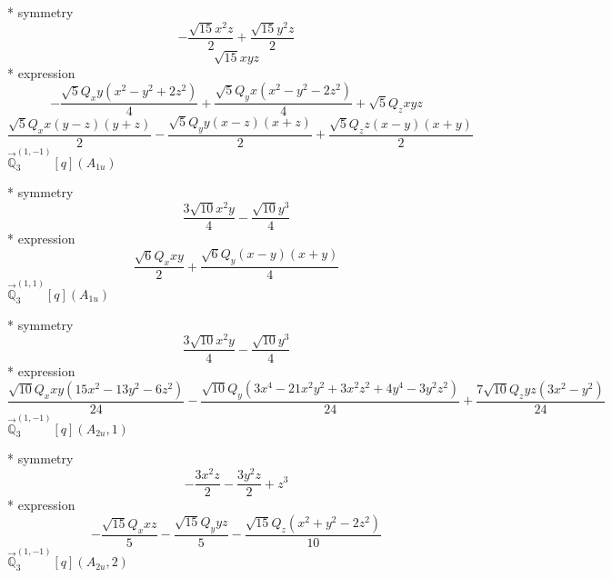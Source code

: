 \documentclass[fleqn,8pt]{jsarticle}
\begin{document}
\noindent\quad ** symmetry
\begin{dmath*}
- \frac{\sqrt{15} x^{2} z}{2} + \frac{\sqrt{15} y^{2} z}{2}
\end{dmath*}
\begin{dmath*}
\sqrt{15} x y z
\end{dmath*}
\noindent\quad ** expression
\begin{dmath*}
- \frac{\sqrt{5} Q_{x} y \left(x^{2} - y^{2} + 2 z^{2}\right)}{4} + \frac{\sqrt{5} Q_{y} x \left(x^{2} - y^{2} - 2 z^{2}\right)}{4} + \sqrt{5} Q_{z} x y z
\end{dmath*}
\begin{dmath*}
\frac{\sqrt{5} Q_{x} x \left(y - z\right) \left(y + z\right)}{2} - \frac{\sqrt{5} Q_{y} y \left(x - z\right) \left(x + z\right)}{2} + \frac{\sqrt{5} Q_{z} z \left(x - y\right) \left(x + y\right)}{2}
\end{dmath*}
\noindent\quad $\vec{\mathbb{Q}}_{3}^{(1,-1)}[q](A_{1u})$

\noindent\quad ** symmetry
\begin{dmath*}
\frac{3 \sqrt{10} x^{2} y}{4} - \frac{\sqrt{10} y^{3}}{4}
\end{dmath*}
\noindent\quad ** expression
\begin{dmath*}
\frac{\sqrt{6} Q_{x} x y}{2} + \frac{\sqrt{6} Q_{y} \left(x - y\right) \left(x + y\right)}{4}
\end{dmath*}
\noindent\quad $\vec{\mathbb{Q}}_{3}^{(1,1)}[q](A_{1u})$

\noindent\quad ** symmetry
\begin{dmath*}
\frac{3 \sqrt{10} x^{2} y}{4} - \frac{\sqrt{10} y^{3}}{4}
\end{dmath*}
\noindent\quad ** expression
\begin{dmath*}
\frac{\sqrt{10} Q_{x} x y \left(15 x^{2} - 13 y^{2} - 6 z^{2}\right)}{24} - \frac{\sqrt{10} Q_{y} \left(3 x^{4} - 21 x^{2} y^{2} + 3 x^{2} z^{2} + 4 y^{4} - 3 y^{2} z^{2}\right)}{24} + \frac{7 \sqrt{10} Q_{z} y z \left(3 x^{2} - y^{2}\right)}{24}
\end{dmath*}
\noindent\quad $\vec{\mathbb{Q}}_{3}^{(1,-1)}[q](A_{2u},1)$

\noindent\quad ** symmetry
\begin{dmath*}
- \frac{3 x^{2} z}{2} - \frac{3 y^{2} z}{2} + z^{3}
\end{dmath*}
\noindent\quad ** expression
\begin{dmath*}
- \frac{\sqrt{15} Q_{x} x z}{5} - \frac{\sqrt{15} Q_{y} y z}{5} - \frac{\sqrt{15} Q_{z} \left(x^{2} + y^{2} - 2 z^{2}\right)}{10}
\end{dmath*}
\noindent\quad $\vec{\mathbb{Q}}_{3}^{(1,-1)}[q](A_{2u},2)$
\end{document}
